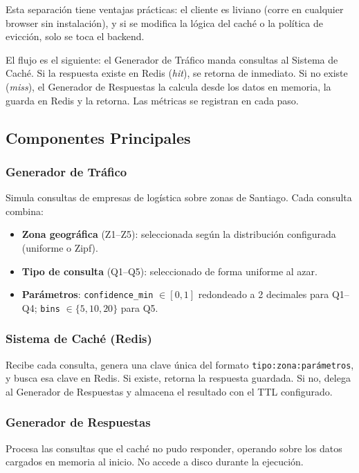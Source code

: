 \documentclass[letter,12pt]{article}
\begin{document}
Esta separación tiene ventajas prácticas: el cliente es liviano (corre en cualquier
browser sin instalación), y si se modifica la lógica del caché o la política de evicción,
solo se toca el backend.

El flujo es el siguiente: el Generador de Tráfico manda consultas al Sistema de Caché.
Si la respuesta existe en Redis (\textit{hit}), se retorna de inmediato. Si no existe
(\textit{miss}), el Generador de Respuestas la calcula desde los datos en memoria, la
guarda en Redis y la retorna. Las métricas se registran en cada paso.

\subsection{Componentes Principales}

\subsubsection{Generador de Tráfico}
Simula consultas de empresas de logística sobre zonas de Santiago. Cada consulta combina:
\begin{itemize}
    \item \textbf{Zona geográfica} (Z1--Z5): seleccionada según la distribución configurada (uniforme o Zipf).
    \item \textbf{Tipo de consulta} (Q1--Q5): seleccionado de forma uniforme al azar.
    \item \textbf{Parámetros}: \texttt{confidence\_min} $\in [0,1]$ redondeado a 2 decimales para Q1--Q4; \texttt{bins} $\in \{5,10,20\}$ para Q5.
\end{itemize}

\subsubsection{Sistema de Caché (Redis)}
Recibe cada consulta, genera una clave única del formato \texttt{tipo:zona:parámetros},
y busca esa clave en Redis. Si existe, retorna la respuesta guardada. Si no, delega al
Generador de Respuestas y almacena el resultado con el TTL configurado.

\subsubsection{Generador de Respuestas}
Procesa las consultas que el caché no pudo responder, operando sobre los datos cargados
en memoria al inicio. No accede a disco durante la ejecución.
\end{document}
